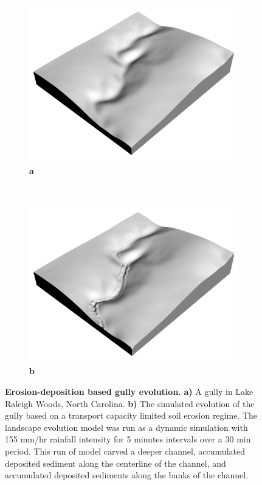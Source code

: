 \documentclass[10pt,letterpaper]{article}
\begin{document}
\begin{figure}
\centering
%   
\begin{subfigure}[b]{0.4\textwidth}
\includegraphics[width=\textwidth]{images/elevation_render.png}
\label{fig_3_1}
\textbf{a} \\
\end{subfigure}
%
~ %
%
\begin{subfigure}[b]{0.4\textwidth}
\includegraphics[width=\textwidth]{images/evolved_elevation_render.png}
\label{fig_3_2}
\textbf{b} \\
\end{subfigure}
%
\caption{{\bf Erosion-deposition based gully evolution.}
\textbf{a)}
A gully in Lake Raleigh Woods, North Carolina.
\textbf{b)}
The simulated evolution of the gully based on a transport capacity limited  soil erosion regime.
The landscape evolution model was run as a dynamic simulation with 155 mm/hr rainfall intensity for 5 minutes intervals over a 30 min period.
This run of model carved a deeper channel, accumulated deposited sediment along the centerline of the channel, and accumulated deposited sediments along the banks of the channel.
}
\label{fig_3}
\end{figure}
\end{document}
